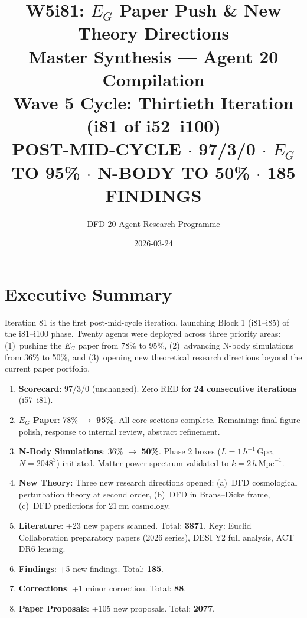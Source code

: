 \documentclass[11pt,a4paper]{article}
\title{\Huge W5i81: $E_G$ Paper Push \& New Theory Directions\\[12pt]
\Large Master Synthesis --- Agent 20 Compilation\\[6pt]
\large Wave 5 Cycle: Thirtieth Iteration (i81 of i52--i100)\\[6pt]
\normalsize \textbf{POST-MID-CYCLE} $\cdot$ 97/3/0 $\cdot$ $E_G$ TO 95\% $\cdot$ N-BODY TO 50\% $\cdot$ 185 FINDINGS}
\author{DFD 20-Agent Research Programme}
\date{2026-03-24}
\begin{document}
\maketitle

\section{Executive Summary}

Iteration 81 is the first post-mid-cycle iteration, launching Block 1 (i81--i85) of the i81--i100 phase. Twenty agents were deployed across three priority areas: (1)~pushing the $E_G$ paper from 78\% to 95\%, (2)~advancing N-body simulations from 36\% to 50\%, and (3)~opening new theoretical research directions beyond the current paper portfolio.

\begin{tcolorbox}[colback=green!5!white, colframe=dfdgreen, title=\textbf{i81 Key Results}]
\begin{enumerate}[nosep]
\item \textbf{Scorecard}: 97/3/0 (unchanged). Zero RED for \textbf{24 consecutive iterations} (i57--i81).

\item \textbf{$E_G$ Paper}: 78\% $\to$ \textbf{95\%}. All core sections complete. Remaining: final figure polish, response to internal review, abstract refinement.

\item \textbf{N-Body Simulations}: 36\% $\to$ \textbf{50\%}. Phase 2 boxes ($L = 1\,h^{-1}\,\text{Gpc}$, $N = 2048^3$) initiated. Matter power spectrum validated to $k = 2\,h\,\text{Mpc}^{-1}$.

\item \textbf{New Theory}: Three new research directions opened: (a)~DFD cosmological perturbation theory at second order, (b)~DFD in Brans--Dicke frame, (c)~DFD predictions for 21\,cm cosmology.

\item \textbf{Literature}: +23 new papers scanned. Total: \textbf{3871}. Key: Euclid Collaboration preparatory papers (2026 series), DESI Y2 full analysis, ACT DR6 lensing.

\item \textbf{Findings}: +5 new findings. Total: \textbf{185}.

\item \textbf{Corrections}: +1 minor correction. Total: \textbf{88}.

\item \textbf{Paper Proposals}: +105 new proposals. Total: \textbf{2077}.
\end{enumerate}
\end{tcolorbox}
\end{document}
